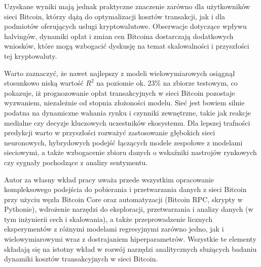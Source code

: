 \documentclass[12pt,a4paper]{report}
\theoremstyle{definition} %
\begin{document}
	Uzyskane wyniki mają jednak praktyczne znaczenie zarówno dla użytkowników sieci Bitcoin, którzy dążą do optymalizacji kosztów transakcji, jak i dla podmiotów oferujących usługi kryptowalutowe. Obserwacje dotyczące wpływu halvingów, dynamiki opłat i zmian cen Bitcoina dostarczają dodatkowych wniosków, które mogą wzbogacić dyskusję na temat skalowalności i przyszłości tej kryptowaluty.

	Warto zaznaczyć, że nawet najlepszy z modeli wielowymiarowych osiągnął stosunkowo niską wartość $R^2$ na poziomie ok. 23\% na zbiorze testowym, co pokazuje, iż prognozowanie opłat transakcyjnych w sieci Bitcoin pozostaje wyzwaniem, niezależnie od stopnia złożoności modelu. Sieć jest bowiem silnie podatna na dynamiczne wahania rynku i czynniki zewnętrzne, takie jak reakcje medialne czy decyzje kluczowych uczestników ekosystemu. Dla lepszej trafności predykcji warto w przyszłości rozważyć zastosowanie głębokich sieci neuronowych, hybrydowych podejść łączących modele zespołowe z modelami sieciowymi, a także wzbogacenie zbioru danych o wskaźniki nastrojów rynkowych czy sygnały pochodzące z analizy sentymentu.

	Autor za własny wkład pracy uważa przede wszystkim opracowanie kompleksowego podejścia do pobierania i przetwarzania danych z sieci Bitcoin przy użyciu węzła Bitcoin Core oraz automatyzacji (Bitcoin RPC, skrypty w Pythonie), wdrożenie narzędzi do eksploracji, przetwarzania i analizy danych (w tym inżynierii cech i skalowania), a także przeprowadzenie licznych eksperymentów z różnymi modelami regresyjnymi zarówno jedno, jak i wielowymiarowymi wraz z dostrajaniem hiperparametrów. Wszystkie te elementy składają się na istotny wkład w rozwój narzędzi analitycznych służących badaniu dynamiki kosztów transakcyjnych w sieci Bitcoin.
\end{document}
